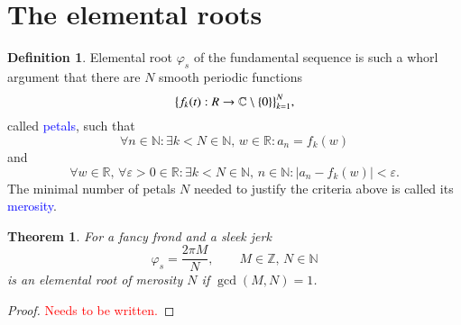 \documentclass{article}
\newcommand{\red}[1]{\textcolor{red}{#1}}
\newcommand{\blue}[1]{\textcolor{blue}{#1}}
\theoremstyle{plain}
\newtheorem{theorem}{Theorem}[section]
\theoremstyle{definition}
\newtheorem{definition}{Definition}[section]
\newcommand{\cmz}{\mathbb C \setminus \{0\} }
\begin{document}
\section{The elemental roots}
\begin{definition}
Elemental root $\varphi_s$ of the fundamental sequence is such a whorl argument that there are $N$ smooth periodic functions 
$$ \big\{f_k(t): \mathbb \mathbb R \rightarrow \cmz\big\}_{k=1}^N 
,$$ called \blue{petals}, such that $$
\forall n \in \mathbb N: \exists k<N \in \mathbb N,\,w \in \mathbb R: a_n = f_k(w) 
$$ and $$
\forall w \in \mathbb R,\, \forall \varepsilon >0  \in \mathbb R: \exists k<N \in \mathbb N,\, n \in \mathbb N: |a_n - f_k(w)|<\varepsilon
.$$
The minimal number of petals $N$ needed to justify the criteria above is called its \blue{merosity}.  	
\end{definition}

\begin{theorem}
For a fancy frond and a sleek jerk $$\varphi_s = \frac{2\pi M}N, \qquad M \in \mathbb Z,\, N \in\mathbb N $$ is an elemental root of merosity $N$ if $\gcd(M,N)=1$.
\end{theorem}
\begin{proof}
\red{Needs to be written.}
\end{proof}
\end{document}
